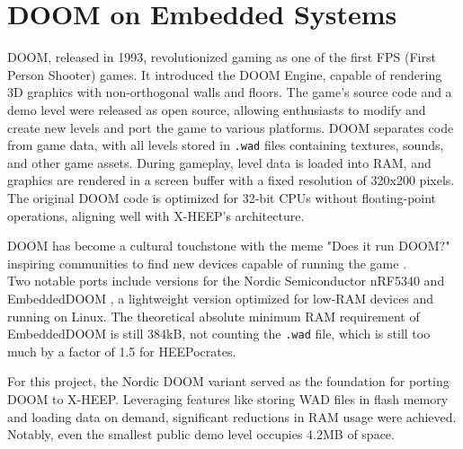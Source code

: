 \section{DOOM on Embedded Systems}

DOOM, released in 1993, revolutionized gaming as one of the first FPS (First Person Shooter) games. It introduced the DOOM Engine, capable of rendering 3D graphics with non-orthogonal walls and floors. The game's source code and a demo level were released as open source, allowing enthusiasts to modify and create new levels and port the game to various platforms. DOOM separates code from game data, with all levels stored in \texttt{.wad} files containing textures, sounds, and other game assets. During gameplay, level data is loaded into RAM, and graphics are rendered in a screen buffer with a fixed resolution of 320x200 pixels. The original DOOM code is optimized for 32-bit CPUs without floating-point operations, aligning well with X-HEEP's architecture.

DOOM has become a cultural touchstone with the meme "Does it run DOOM?" inspiring communities to find new devices capable of running the game \cite{canItRunDOOM, redditDOOMCommunity}. \\

Two notable ports include versions for the Nordic Semiconductor nRF5340 \cite{nordicDOOM} and EmbeddedDOOM \cite{embeddedDOOM}, a lightweight version optimized for low-RAM devices and running on Linux. The theoretical absolute minimum RAM requirement of EmbeddedDOOM is still 384kB, not counting the \texttt{.wad} file, which is still too much by a factor of 1.5 for HEEPocrates.

For this project, the Nordic DOOM variant served as the foundation for porting DOOM to X-HEEP. Leveraging features like storing WAD files in flash memory and loading data on demand, significant reductions in RAM usage were achieved. Notably, even the smallest public demo level occupies 4.2MB of space.
